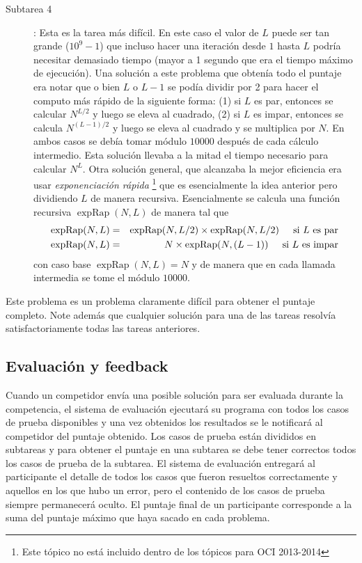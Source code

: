 \begin{description}
\item[Subtarea 4]: Esta es la tarea más difícil.
  En este caso el valor de $L$ puede ser tan grande
($10^9-1$) que incluso hacer una iteración desde $1$ hasta $L$ podría necesitar
demasiado tiempo (mayor a 1 segundo que era el tiempo máximo de ejecución).
Una solución a este problema que obtenía todo el puntaje era notar que o bien
$L$ o $L-1$ se podía dividir por 2 para hacer el computo más rápido de la
siguiente forma: (1) si $L$ es par, entonces se calcular $N^{L/2}$ y luego se
eleva al cuadrado, (2) si $L$ es impar, entonces se calcula $N^{(L-1)/2}$ y
luego se eleva al cuadrado y se multiplica por $N$.
En ambos casos se debía tomar módulo $10000$ después de cada cálculo intermedio.
Esta solución llevaba a la mitad el tiempo necesario para calcular $N^L$.
Otra solución general, que alcanzaba la mejor eficiencia era usar
\emph{exponenciación rápida}%
\footnote{Este tópico no está incluido dentro de los tópicos para OCI 2013-2014}
que es esencialmente la idea anterior pero dividiendo $L$ de manera recursiva.
Esencialmente se calcula una función recursiva $\operatorname{expRap}(N,L)$ de manera tal que
\begin{eqnarray*}
\operatorname{expRap}(N,L) & = &\operatorname{expRap}(N,{L}/{2}) \times 
\operatorname{expRap}(N,{L}/{2}) \text{\;\;\;\; si $L$ es par} \\
\operatorname{expRap}(N,L) & = & N\times \operatorname{expRap}(N,{(L-1)}) \text{\;\;\;\; si $L$ es impar}
\end{eqnarray*}
con caso base $\operatorname{expRap}(N,L)=N$ y de manera que en cada llamada intermedia 
se tome el módulo $10000$.

\end{description}
Este problema es un problema claramente difícil para obtener el puntaje completo.
Note además que cualquier solución para una de las tareas resolvía satisfactoriamente todas
las tareas anteriores.

\subsection{Evaluación y feedback}

Cuando un competidor envía una posible solución para ser evaluada durante la competencia,
el sistema de evaluación ejecutará su programa con todos los casos de prueba disponibles 
y una vez obtenidos los resultados se le notificará al competidor del puntaje obtenido.
Los casos de prueba están divididos en subtareas y para obtener el puntaje en
una subtarea se debe tener correctos todos los casos de prueba de la subtarea.
El sistema de evaluación entregará al participante el detalle de todos los casos
que fueron resueltos correctamente y aquellos en los que hubo un error, pero el
contenido de los casos de prueba siempre permanecerá oculto.
El puntaje final de un participante corresponde a la suma del puntaje máximo que
haya sacado en cada problema.

